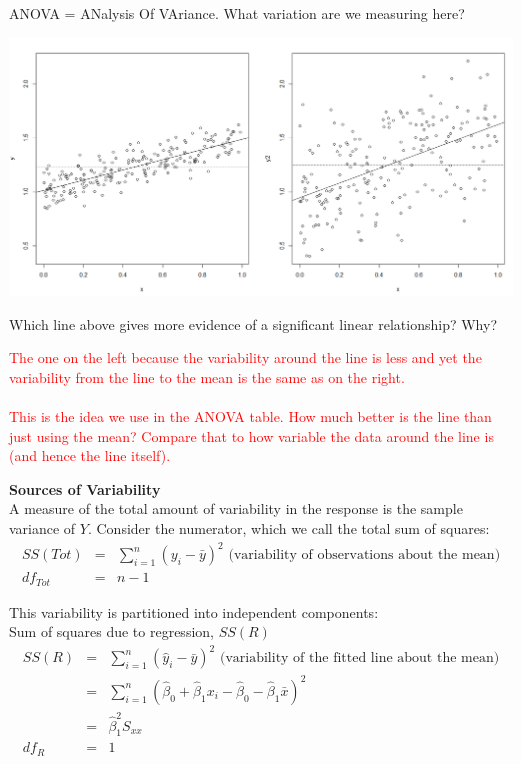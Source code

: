 ANOVA = ANalysis Of VAriance.  What variation are we measuring here?
\begin{flushleft}
\includegraphics[scale=0.4]{slopes}
\end{flushleft}
Which line above gives more evidence of a significant linear relationship?  Why?

\textcolor{red}{The one on the left because the variability around the line is less and yet the variability from the line to the mean is the same as on the right.  \\~\\
This is the idea we use in the ANOVA table.  How much better is the line than just using the mean?  Compare that to how variable the data around the line is (and hence the line itself).}

\newpage

\textbf{Sources of Variability}\\
A measure of the total amount of variability in the response is the sample variance of $Y$.  Consider the numerator, which we call the total sum of squares:
\begin{eqnarray*}
SS(Tot) &= &\sum_{i=1}^n (y_i - \bar{y})^2 \text{   (variability of observations about the mean)}\\
df_{Tot}&=&n-1
\end{eqnarray*}

This variability is partitioned into independent components: \\
Sum of squares due to regression, $SS(R)$
\begin{eqnarray*}
SS(R) & = & \sum_{i=1}^n (\hat{y}_i - \bar{y})^2 \text{     (variability of the fitted line about the mean)}\\
& = & \sum_{i=1}^n (\hat{\beta}_0+\hat{\beta}_1x_i - \hat{\beta}_0-\hat{\beta}_1\bar{x})^2\\
& = & \hat{\beta}_{1}^2S_{xx}\\
df_R & = & 1
\end{eqnarray*}

